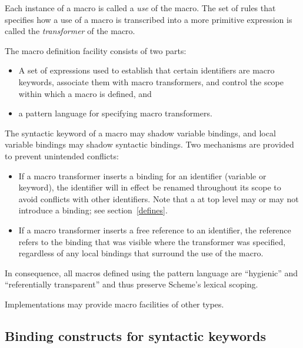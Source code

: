 Each instance of a macro is called a {\em use}
of the macro.
The set of rules that specifies
how a use of a macro is transcribed into a more primitive expression
is called the {\em transformer}
of the macro.

The macro definition facility consists of two parts:

\begin{itemize}
\item A set of expressions used to establish that certain identifiers
are macro keywords, associate them with macro transformers, and control
the scope within which a macro is defined, and

\item a pattern language for specifying macro transformers.
\end{itemize}

The syntactic keyword of a macro may shadow variable bindings, and local
variable bindings may shadow syntactic bindings.    
Two mechanisms are provided to prevent unintended conflicts:

\begin{itemize}

\item If a macro transformer inserts a binding for an identifier
(variable or keyword), the identifier will in effect be renamed
throughout its scope to avoid conflicts with other identifiers.
Note that a  at top level may or may not introduce a binding;
see section~\ref{defines}.

\item If a macro transformer inserts a free reference to an
identifier, the reference refers to the binding that was visible
where the transformer was specified, regardless of any local
bindings that surround the use of the macro.

\end{itemize}

In consequence, all macros
defined using the pattern language  are ``hygienic'' and ``referentially
transparent'' and thus preserve Scheme's lexical scoping.~\cite{Kohlbecker86,
hygienic,Bawden88,macrosthatwork,syntacticabstraction}

Implementations may provide macro facilities of other types.

\subsection{Binding constructs for syntactic keywords}
\label{bindsyntax}

